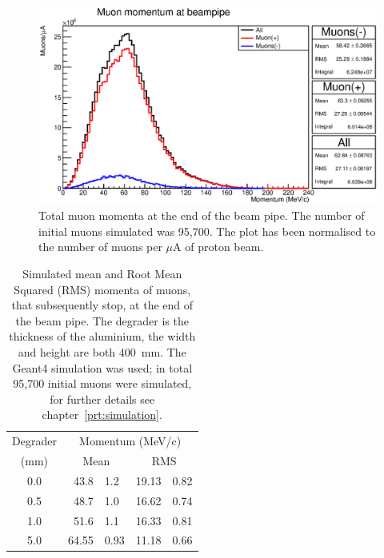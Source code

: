\begin{figure}[hptb]
  \centering
    \includegraphics[width=.9\textwidth]{images/momentum_spectrum/muon_momentum_at_beam_pipe_exit.eps}
  \caption{Total muon momenta at the end of the beam pipe. The number of initial muons simulated was 95,700. The plot has been normalised to the number of muons per \(\mu\)A of proton beam.}
  \label{fig:images_momentum_spectrum_muon_momentum_at_beam_pipe_exit}
\end{figure}

\begin{table}
  \lineup
  \begin{center}
  \begin{tabular}{c | r@{\(\pm\)}l | r@{\(\pm\)}l }
    Degrader  &  \multicolumn{4}{c}{Momentum (MeV/c)}        \\
      (mm)    &  \multicolumn{2}{c|}{Mean}  
                                 &  \multicolumn{2}{c}{RMS}  \\
    \hline
      0.0     &  43.8  & 1.2   &  19.13 & 0.82               \\
      0.5     &  48.7  & 1.0   &  16.62 & 0.74               \\
      1.0     &  51.6  & 1.1   &  16.33 & 0.81               \\
      5.0     &  64.55 & 0.93  &  11.18 & 0.66               \\
  \end{tabular}
  \end{center}
  \caption{Simulated mean and Root Mean Squared (RMS) momenta of muons, that subsequently stop, at the end of the beam pipe. The degrader is the thickness of the aluminium, the width and height are both 400~mm. The Geant4 simulation was used; in total 95,700 initial muons were simulated, for further details see chapter~\ref{prt:simulation}.}
  \label{tab:stopped_muon_mom}
\end{table}

